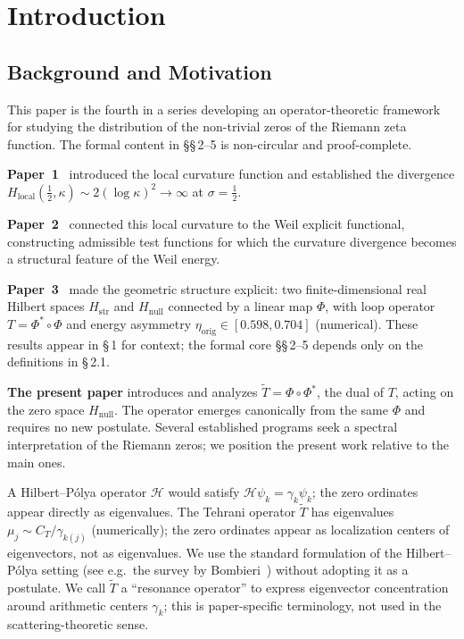 \documentclass[11pt]{article}
\newcommand{\Hstr}{H_{\mathrm{str}}}
\newcommand{\Hnull}{H_{\mathrm{null}}}
\newcommand{\etaorig}{\eta_{\mathrm{orig}}}
\newcommand{\Tt}{\widetilde{T}}
\newcommand{\CT}{C_{T}}
\begin{document}
\newpage

\section{Introduction}

\subsection{Background and Motivation}

This paper is the fourth in a series developing an operator-theoretic
framework for studying the distribution of the non-trivial zeros of
the Riemann zeta function. The formal content in \S\S\,2--5 is
non-circular and proof-complete.

\textbf{Paper~1}~\cite{Paper1} introduced the local curvature function and
established the divergence
$H_{\mathrm{local}}(\tfrac{1}{2},\kappa)\sim 2(\log\kappa)^2\to\infty$
at $\sigma=\tfrac{1}{2}$.

\textbf{Paper~2}~\cite{Paper2} connected this local curvature to the
Weil explicit functional, constructing admissible test functions
for which the curvature divergence becomes a structural feature of
the Weil energy.

\textbf{Paper~3}~\cite{Paper3} made the geometric structure explicit: two
finite-dimensional real Hilbert spaces $\Hstr$ and $\Hnull$ connected
by a linear map $\Phi$, with loop operator $T = \Phi^*\circ\Phi$ and
energy asymmetry $\etaorig \in [0.598, 0.704]$ (numerical).
These results appear in \S\,1 for context; the formal core
\S\S\,2--5 depends only on the definitions in \S\,2.1.

\textbf{The present paper} introduces and analyzes $\Tt = \Phi\circ\Phi^*$,
the dual of $T$, acting on the zero space $\Hnull$. The operator
emerges canonically from the same $\Phi$ and requires no new
postulate. Several established programs seek a spectral interpretation
of the Riemann zeros; we position the present work relative to the
main ones.

A Hilbert--P\'olya operator $\mathcal{H}$ would satisfy
$\mathcal{H}\psi_k = \gamma_k\psi_k$; the zero ordinates appear
directly as eigenvalues. The Tehrani operator $\Tt$ has eigenvalues
$\mu_j\sim\CT/\gamma_{k(j)}$ (numerically); the zero ordinates appear
as localization centers of eigenvectors, not as eigenvalues. We use the
standard formulation of the Hilbert--P\'olya setting (see e.g.\ the
survey by Bombieri~\cite{Bombieri}) without adopting it as a postulate.
We call $\Tt$ a ``resonance operator'' to express eigenvector
concentration around arithmetic centers $\gamma_k$; this is
paper-specific terminology, not used in the scattering-theoretic sense.
\end{document}
